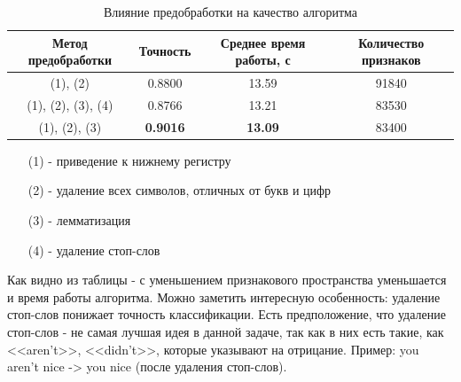 \documentclass[a4paper, 11pt]{article}
\begin{document}
            \begin{table}[H]
                \begin{center}
                \caption[Caption1]{Влияние предобработки на качество алгоритма}
                \label{simple_lemma_stopword_dimension}
                    \begin{tabular}{|c|c|c|c|}  
                        \hline 
                        Метод предобработки & Точность & Среднее время работы, с & Количество признаков \\ 
                        \hline 
                        (1), (2) & 0.8800 & 13.59 & 91840 \\ 
                        \hline 
                        (1), (2), (3), (4) & 0.8766 & 13.21 & 83530 \\
                        \hline 
                        (1), (2), (3) & \textbf{0.9016} & \textbf{13.09} & 83400 \\ 
                        \hline 
                    \end{tabular}
                
                \begin{enumerate}
                    \item[(1)] - приведение к нижнему регистру
                    \item[(2)] - удаление всех символов, отличных от букв и цифр
                    \item[(3)] - лемматизация
                    \item[(4)] - удаление стоп-слов
                \end{enumerate}
                \end{center}
            
            \end{table}
        Как видно из таблицы - с уменьшением признакового пространства уменьшается и время работы алгоритма. Можно заметить интересную особенность: удаление стоп-слов понижает точность классификации. Есть предположение, что удаление стоп-слов - не самая лучшая идея в данной задаче, так как в них есть такие, как <<aren't>>, <<didn't>>, которые указывают на отрицание. Пример: you aren't nice -> you nice (после удаления стоп-слов).
        
\end{document}
